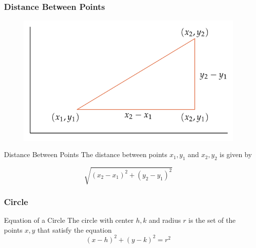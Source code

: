 \documentclass{beamer}
\begin{document}
 \begin{frame}
  \frametitle{Distance Between Points}
  \begin{figure}
    \centering
    \includegraphics[scale=0.3]{distance-between-points.png}
  \end{figure}
 \begin{alertblock}{Distance Between Points}
  The distance between points \(x_{1}, y_{1}\) and \(x_{2}, y_{2}\) is given by 
  
  \[\sqrt{ \left(x_{2} - x_{1} \right)^{2}  + \left( y_{2} - y_{1} \right)^{2} }\]
  
 \end{alertblock}
 \end{frame}

 \begin{frame}
  \frametitle{Circle}
  \begin{block}{Equation of a Circle}
    The circle with center \(h,k\) and radius \(r\) is the set of the points \(x,y\) that satisfy the equation
    \[\left(x-h\right)^{2} + \left(y-k\right)^{2} = r^{2}\] 
  \end{block}
 \end{frame}
\end{document}

